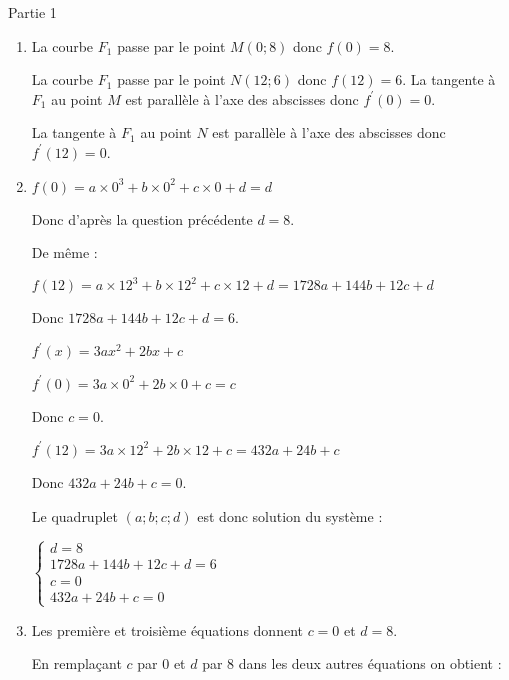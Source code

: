 \begin{corrige}
     \begin{h3}Partie 1\end{h3}
     \begin{enumerate}
          \item
          La courbe $F_1$ passe par le point $M(0;8)$ donc $f(0)=8$.
          \par
          La courbe $F_1$ passe par le point $N(12;6)$ donc $f(12)=6$.
     La tangente à $F_1$ au point $M$ est parallèle à l'axe des abscisses donc $f ^{\prime}(0)=0$.
     \par
     La tangente à $F_1$ au point $N$ est parallèle à l'axe des abscisses donc $f ^{\prime}(12)=0$.
     \item
     $f(0)=a\times 0^3+b \times 0^2+c \times 0+d=d$
     \par
     Donc d'après la question précédente $d=8$.
     \par
     De même :
     \par
     $f(12)=a\times 12^3+b \times 12^2+c \times 12+d$$=1728a+144b+12c+d$
     \par
     Donc  $1728a+144b+12c+d=6$.
     \par
     $f ^{\prime}(x)=3ax^2+2bx+c$
     \par
     $f ^{\prime}(0)=3a \times 0^2+2b \times 0+c=c$
     \par
     Donc $c=0$.
     \par
     $f ^{\prime}(12)=3a \times 12^2+2b \times 12+c=432a+24b+c$
     \par
     Donc $432a+24b+c=0$.
     \par
     Le quadruplet $(a;b;c;d)$ est donc solution du système :
     \par
     $\begin{cases}  d=8 \\ 1728a+144b+12c+d=6 \\ c=0 \\   432a+24b+c=0 \end{cases}$
     \item
     Les première et troisième équations donnent $c=0$ et $d=8$.
     \par
     En remplaçant $c$ par $0$ et $d$ par $8$ dans les deux autres équations on obtient :
     \par
$$
\end{enumerate}
\end{corrige}
